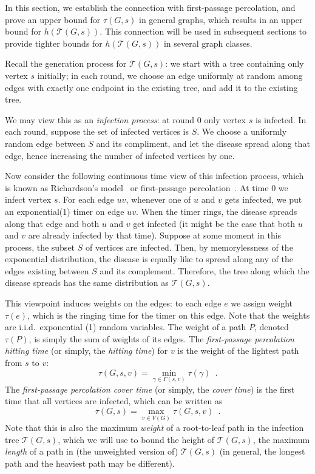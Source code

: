 \documentclass{patmorin}
\newcommand{\tcal}{\mathcal{T}}
\begin{document}
In this section, we establish the connection with first-passage percolation, and prove an upper bound for $\tau(G,s)$ in general graphs, which results in an upper bound for $h(\tcal(G,s))$.
This connection will be used in subsequent sections to provide tighter bounds for $h(\tcal(G,s))$ in several graph classes.



Recall the generation process for $\tcal(G,s)$:
we start with a tree containing only vertex $s$ initially;
in each round, we choose an edge uniformly at random
among edges with exactly one endpoint in the existing tree,
and add it to the existing tree.


We may view this as an \emph{infection process}:
at round 0 only vertex $s$ is infected.
In each round, suppose the set of infected vertices is $S$.
We choose a uniformly random edge between $S$ and its compliment, and let the disease spread along that edge, hence increasing the number of infected vertices by one.

Now consider the following 
continuous time view of this infection process, which is  known as Richardson's model~\cite{richardson_survey} or first-passage percolation~\cite{fpp_survey}.
At time $0$ we infect vertex $s$.
For each edge $uv$, whenever one of $u$ and $v$ gets infected,
we put an exponential(1) timer on edge $uv$.
When the timer rings, the disease spreads along that edge and both $u$ and $v$ get infected (it might be the case that both $u$ and $v$ are already infected by that time).
Suppose at some moment in this process, the subset $S$ of vertices are infected. Then, by memorylessness of the exponential distribution, the disease is equally like to spread along any of the edges existing between $S$ and its complement.
Therefore, the tree along which the disease spreads has the same distribution as $\tcal(G,s)$.

This viewpoint induces weights on the edges:
to each edge $e$ we  assign weight $\tau(e)$, which is the ringing time for the timer on this edge.
Note that the weights are i.i.d.\ exponential (1) random variables.
The weight of a path $P$, denoted $\tau(P)$, is simply the sum of weights of its edges.  The \emph{first-passage percolation hitting time} (or simply, the \emph{hitting time}) for $v$ is the weight of the lightest path from $s$ to $v$:
\[
    \tau(G,s,v) = \min_{\gamma\in\Gamma(s,v)} \tau(\gamma) \enspace .
\]
The \emph{first-passage percolation cover time} (or simply, the \emph{cover time}) is the first time that all vertices are infected, which can be written as
\[
	\tau(G,s) = \max_{v\in V(G)} \tau(G,s,v)  \enspace .
\]
Note that this is also the maximum \emph{weight} of a root-to-leaf path in the infection tree $\tcal(G,s)$, 
which we will use to bound the {height} of $\tcal(G,s)$,
the maximum \emph{length} of a path in (the unweighted version of) $\tcal(G,s)$ (in general, the longest path and the heaviest path may be different).
\end{document}
